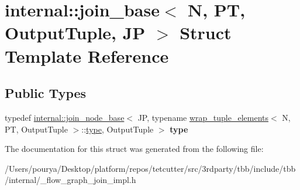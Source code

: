 \hypertarget{structinternal_1_1join__base}{}\section{internal\+:\+:join\+\_\+base$<$ N, P\+T, Output\+Tuple, J\+P $>$ Struct Template Reference}
\label{structinternal_1_1join__base}
\subsection*{Public Types}
\begin{DoxyCompactItemize}
\item 
\hypertarget{structinternal_1_1join__base_a4f106041857d2b085e4ab98045d5d2f3}{}typedef \hyperlink{classinternal_1_1join__node__base}{internal\+::join\+\_\+node\+\_\+base}$<$ J\+P, typename \hyperlink{structinternal_1_1wrap__tuple__elements}{wrap\+\_\+tuple\+\_\+elements}$<$ N, P\+T, Output\+Tuple $>$\+::\hyperlink{classinternal_1_1join__node__base}{type}, Output\+Tuple $>$ {\bfseries type}\label{structinternal_1_1join__base_a4f106041857d2b085e4ab98045d5d2f3}

\end{DoxyCompactItemize}


The documentation for this struct was generated from the following file\+:\begin{DoxyCompactItemize}
\item 
/\+Users/pourya/\+Desktop/platform/repos/tetcutter/src/3rdparty/tbb/include/tbb/internal/\+\_\+flow\+\_\+graph\+\_\+join\+\_\+impl.\+h\end{DoxyCompactItemize}
